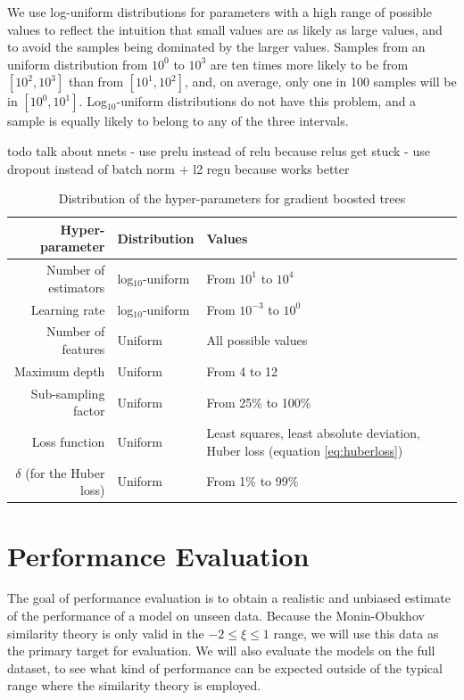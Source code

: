 \documentclass[12pt]{book}
\begin{document}
We use log-uniform distributions for parameters with a high range of possible values to reflect the intuition that small values are as likely as large values, and to avoid the samples being dominated by the larger values. Samples from an uniform distribution from $10^0$ to $10^3$ are ten times more likely to be from $[10^2,10^3]$ than from $[10^1,10^2]$, and, on average, only one in 100 samples will be in $[10^0,10^1]$. Log$_{10}$-uniform distributions do not have this problem, and a sample is equally likely to belong to any of the three intervals.

todo talk about nnets
 - use prelu instead of relu because relus get stuck
 - use dropout instead of batch norm + l2 regu because works better

\begin{table}[]
\centering
\caption{Distribution of the hyper-parameters for gradient boosted trees}
\label{tbl:gb_hyperparams}
\begin{tabularx}{\textwidth}{r|l|X}
\textbf{Hyper-parameter} & \textbf{Distribution} & \textbf{Values} \\ \hline
Number of estimators & log$_{10}$-uniform & From $10^1$ to $10^4$ \\
Learning rate & log$_{10}$-uniform & From $10^{-3}$ to $10^0$ \\
Number of features & Uniform & All possible values \\
Maximum depth & Uniform & From 4 to 12 \\
Sub-sampling factor & Uniform & From 25\% to 100\% \\
Loss function & Uniform & Least squares, least absolute deviation, \newline Huber loss (equation \ref{eq:huberloss}) \\
$\delta$ (for the Huber loss) & Uniform & From 1\% to 99\%
\end{tabularx}
\end{table}



\section{Performance Evaluation}
\label{sec:perf_eval}
The goal of performance evaluation is to obtain a realistic and unbiased estimate of the performance of a model on unseen data. Because the Monin-Obukhov similarity theory is only valid in the $-2\leq\xi\leq1$ range, we will use this data as the primary target for evaluation. We will also evaluate the models on the full dataset, to see what kind of performance can be expected outside of the typical range where the similarity theory is employed.
\end{document}
